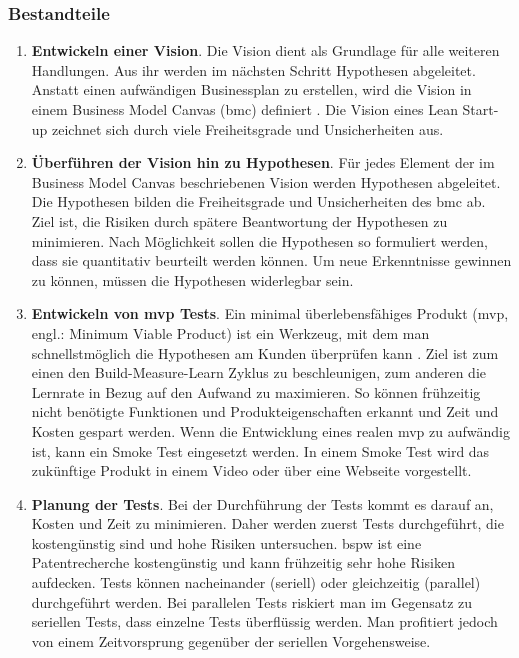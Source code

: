 \subsubsection*{Bestandteile}
\begin{enumerate}
 \item \textbf{Entwickeln einer Vision}. Die Vision dient als Grundlage für alle weiteren Handlungen. Aus ihr werden im nächsten Schritt Hypothesen abgeleitet. Anstatt einen aufwändigen Businessplan zu erstellen, wird die Vision in einem Business Model Canvas (\gls{bmc}) definiert \autocite{Blank2013}. Die Vision eines Lean Start-up zeichnet sich durch viele Freiheitsgrade und Unsicherheiten aus. 

\item \textbf{Überführen der Vision hin zu Hypothesen}. Für jedes Element der im Business Model Canvas beschriebenen Vision werden Hypothesen abgeleitet. Die Hypothesen bilden die Freiheitsgrade und Unsicherheiten des \gls{bmc} ab. Ziel ist, die Risiken durch spätere Beantwortung der Hypothesen zu minimieren. Nach Möglichkeit sollen die Hypothesen so formuliert werden, dass sie quantitativ beurteilt werden können. Um neue Erkenntnisse gewinnen zu können, müssen die Hypothesen widerlegbar sein. 

\item \textbf{Entwickeln von \gls{mvp} Tests}. Ein minimal überlebensfähiges Produkt (\gls{mvp}, engl.: Minimum Viable Product) ist ein Werkzeug, mit dem man schnellstmöglich die Hypothesen am Kunden überprüfen kann \autocite[93]{Ries2011}. Ziel ist zum einen den Build-Measure-Learn Zyklus zu beschleunigen, zum anderen die Lernrate in Bezug auf den Aufwand zu maximieren. So können frühzeitig nicht benötigte Funktionen und Produkteigenschaften erkannt und Zeit und Kosten gespart werden. Wenn die Entwicklung eines realen \gls{mvp} zu aufwändig ist, kann ein Smoke Test eingesetzt werden. In einem Smoke Test wird das zukünftige Produkt in einem Video oder über eine Webseite vorgestellt.

\item \textbf{Planung der Tests}. Bei der Durchführung der Tests kommt es darauf an, Kosten und Zeit zu minimieren. Daher werden zuerst Tests durchgeführt, die kostengünstig sind und hohe Risiken untersuchen. \Gls{bspw} ist eine Patentrecherche kostengünstig und kann frühzeitig sehr hohe Risiken aufdecken. Tests können nacheinander (seriell) oder gleichzeitig (parallel) durchgeführt werden. Bei parallelen Tests riskiert man im Gegensatz zu seriellen Tests, dass einzelne Tests überflüssig werden. Man profitiert jedoch von einem Zeitvorsprung gegenüber der seriellen Vorgehensweise. 


\end{enumerate}
